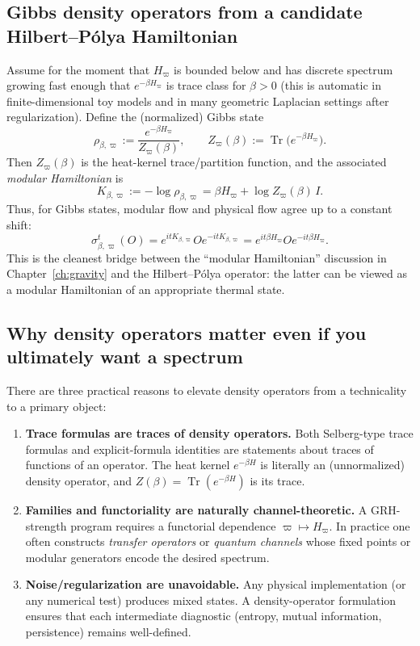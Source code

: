 \documentclass[11pt,oneside]{amsbook}
\numberwithin{equation}{section}
\theoremstyle{plain}
\theoremstyle{definition}
\theoremstyle{remark}
\DeclareMathOperator{\Tr}{\mathrm{Tr}}
\begin{document}
\subsection{Gibbs density operators from a candidate Hilbert--Pólya Hamiltonian}
Assume for the moment that $H_\varpi$ is bounded below and has discrete spectrum growing fast enough that $e^{-\beta H_\varpi}$ is trace class for $\beta>0$ (this is automatic in finite-dimensional toy models and in many geometric Laplacian settings after regularization).
Define the (normalized) Gibbs state
\begin{equation}
\label{eq:gibbs_state}
\rho_{\beta,\varpi}:=\frac{e^{-\beta H_\varpi}}{Z_\varpi(\beta)},\qquad
Z_\varpi(\beta):=\Tr\bigl(e^{-\beta H_\varpi}\bigr).
\end{equation}
Then $Z_\varpi(\beta)$ is the heat-kernel trace/partition function, and the associated \emph{modular Hamiltonian} is
\[
K_{\beta,\varpi}:=-\log\rho_{\beta,\varpi}=\beta H_\varpi + \log Z_\varpi(\beta)\,I.
\]
Thus, for Gibbs states, modular flow and physical flow agree up to a constant shift:
\[
\sigma_{\beta,\varpi}^t(O)=e^{itK_{\beta,\varpi}}Oe^{-itK_{\beta,\varpi}}
=
e^{it\beta H_\varpi}Oe^{-it\beta H_\varpi}.
\]
This is the cleanest bridge between the ``modular Hamiltonian'' discussion in Chapter~\ref{ch:gravity} and the Hilbert--Pólya operator: the latter can be viewed as a modular Hamiltonian of an appropriate thermal state.

\subsection{Why density operators matter even if you ultimately want a spectrum}
There are three practical reasons to elevate density operators from a technicality to a primary object:
\begin{enumerate}
\item \textbf{Trace formulas are traces of density operators.}
Both Selberg-type trace formulas and explicit-formula identities are statements about traces of functions of an operator.
The heat kernel $e^{-\beta H}$ is literally an (unnormalized) density operator, and $Z(\beta)=\Tr(e^{-\beta H})$ is its trace.
\item \textbf{Families and functoriality are naturally channel-theoretic.}
A GRH-strength program requires a functorial dependence $\varpi\mapsto H_\varpi$.
In practice one often constructs \emph{transfer operators} or \emph{quantum channels} whose fixed points or modular generators encode the desired spectrum.
\item \textbf{Noise/regularization are unavoidable.}
Any physical implementation (or any numerical test) produces mixed states.
A density-operator formulation ensures that each intermediate diagnostic (entropy, mutual information, persistence) remains well-defined.
\end{enumerate}
\end{document}

